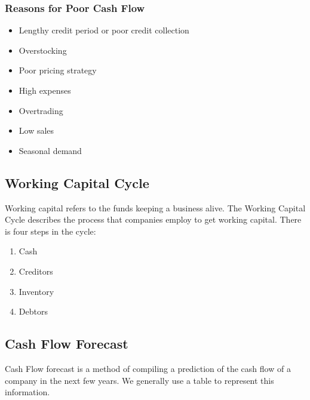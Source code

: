 \documentclass{standalone}
\begin{document}
\subsubsection{Reasons for Poor Cash Flow}
\begin{itemize}
    \item Lengthy credit period or poor credit collection
    \item Overstocking
    \item Poor pricing strategy
    \item High expenses
    \item Overtrading
    \item Low sales
    \item Seasonal demand
\end{itemize}

\subsection{Working Capital Cycle}
Working capital refers to the funds keeping a business alive.
The Working Capital Cycle describes the process that companies employ to get working capital.
There is four steps in the cycle:
\begin{enumerate}
    \item Cash
    \item Creditors
    \item Inventory
    \item Debtors
\end{enumerate}

\subsection{Cash Flow Forecast}
Cash Flow forecast is a method of compiling a prediction of the cash flow of a company in the next few years.
We generally use a table to represent this information.
\end{document}
